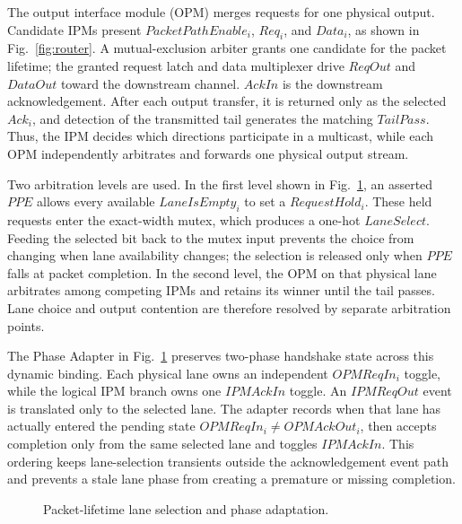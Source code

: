 \documentclass[conference]{IEEEtran}
\begin{document}
The output interface module (OPM) merges requests for one physical output.
Candidate IPMs present \(PacketPathEnable_i\), \(Req_i\), and \(Data_i\),
as shown in Fig.~\ref{fig:router}. A mutual-exclusion arbiter grants one
candidate for the packet lifetime; the granted request latch and data
multiplexer drive \(ReqOut\) and \(DataOut\) toward the downstream
channel. \(AckIn\) is the downstream acknowledgement. After each output
transfer, it is returned only as the selected \(Ack_i\), and detection of
the transmitted tail generates the matching \(TailPass\). Thus, the IPM
decides which directions participate in a multicast, while each OPM
independently arbitrates and forwards one physical output stream.

Two arbitration levels are used. In the first level shown in
Fig.~\ref{fig:lane-adapter}, an asserted \(PPE\) allows every available
\(LaneIsEmpty_i\) to set a \(RequestHold_i\). These held requests enter
the exact-width mutex, which produces a one-hot \(LaneSelect\). Feeding
the selected bit back to the mutex input prevents the choice from
changing when lane availability changes; the selection is released only
when \(PPE\) falls at packet completion. In the second level, the OPM on
that physical lane arbitrates among competing IPMs and retains its winner
until the tail passes. Lane choice and output contention are therefore
resolved by separate arbitration points.

The Phase Adapter in Fig.~\ref{fig:lane-adapter} preserves two-phase
handshake state across this dynamic binding. Each physical lane owns an
independent \(OPMReqIn_i\) toggle, while the logical IPM branch owns one
\(IPMAckIn\) toggle. An \(IPMReqOut\) event is translated only to the
selected lane. The adapter records when that lane has actually entered
the pending state \(OPMReqIn_i\neq OPMAckOut_i\), then accepts completion
only from the same selected lane and toggles \(IPMAckIn\). This ordering
keeps lane-selection transients outside the acknowledgement event path
and prevents a stale lane phase from creating a premature or missing
completion.

\endgroup

\setcounter{figure}{6}
\begin{figure}[!t]
\centering

\caption{Packet-lifetime lane selection and phase adaptation.}
\label{fig:lane-adapter}
\end{figure}
\setcounter{figure}{8}
\end{document}
